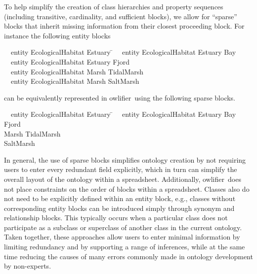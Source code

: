 \documentclass[5p,authoryear]{elsarticle}
\newcommand{\owlifier}{\textsf{owlifier}}
\begin{document}
To help simplify the creation of class hierarchies and property
sequences (including transitive, cardinality, and sufficient blocks),
we allow for ``sparse'' blocks that inherit missing information from
their closest proceeding block. For instance the following entity
blocks
\begin{tabbing}
  ~~\textsf{entity} \= \textsf{EcologicalHabitat} \= \textsf{Estuary} \= \kill
  ~~\textsf{entity} \> \textsf{EcologicalHabitat} \> \textsf{Estuary} \> 
  \textsf{Bay}\\
  ~~\textsf{entity} \> \textsf{EcologicalHabitat} \> \textsf{Estuary} \>
  \textsf{Fjord} \\
  ~~\textsf{entity} \> \textsf{EcologicalHabitat} \> \textsf{Marsh} \>
  \textsf{TidalMarsh} \\ 
  ~~\textsf{entity} \> \textsf{EcologicalHabitat} \> \textsf{Marsh} \>
  \textsf{SaltMarsh}
\end{tabbing}
can be equivalently represented in \owlifier\ using the following
sparse blocks.
\begin{tabbing}
  ~~\textsf{entity} \= \textsf{EcologicalHabitat} \= \textsf{Estuary} \= \kill
  ~~\textsf{entity} \> \textsf{EcologicalHabitat} \> \textsf{Estuary} \> 
  \textsf{Bay}\\
  \> \> \> \textsf{Fjord} \\
  \> \> \textsf{Marsh} \> \textsf{TidalMarsh} \\ 
  \> \> \> \textsf{SaltMarsh}
\end{tabbing}
In general, the use of sparse blocks simplifies ontology creation by
not requiring users to enter every redundant field explicitly, which
in turn can simplify the overall layout of the ontology within a
spreadsheet.  Additionally, \owlifier\ does not place constraints on
the order of blocks within a spreadsheet. Classes also do not need to
be explicitly defined within an entity block, e.g., classes without
corresponding entity blocks can be introduced simply through synonym
and relationship blocks. This typically occurs when a particular class
does not participate as a subclass or superclass of another class in
the current ontology. Taken together, these approaches allow users to
enter minimal information by limiting redundancy and by supporting a
range of inferences, while at the same time reducing the causes of
many errors commonly made in ontology development by non-experts.
\end{document}
